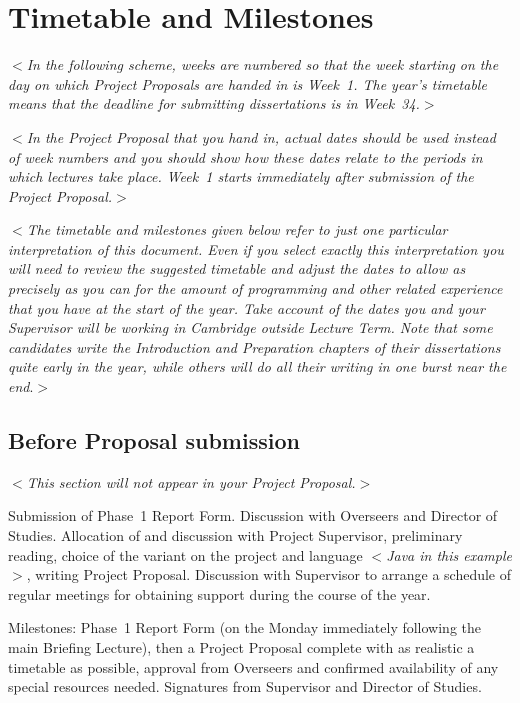 \documentclass[12pt]{article}
\newcommand{\al}{$<$}
\newcommand{\ar}{$>$}
\begin{document}
\section*{Timetable and Milestones}

\al\emph{In the following scheme, weeks are numbered so that the week
  starting on the day on which Project Proposals are handed in is
  Week~1.  The year's timetable means that the deadline for submitting
  dissertations is in Week~34.}\ar

\al\emph{In the Project Proposal that you hand in, {\rm actual dates}
  should be used instead of week numbers and you should show how these
  dates relate to the periods in which lectures take place. Week~1
  starts immediately after submission of the Project Proposal.}\ar

\al\emph{The timetable and milestones given below refer to just one
  particular interpretation of this document.  Even if you select
  exactly this interpretation you will need to review the suggested
  timetable and adjust the dates to allow as precisely as you can for
  the amount of programming and other related experience that you have
  at the start of the year.  Take account of the dates you and your
  Supervisor will be working in Cambridge outside Lecture Term.  Note
  that some candidates write the Introduction and Preparation chapters
  of their dissertations quite early in the year, while others will do
  all their writing in one burst near the end}.\ar


\subsection*{Before Proposal submission}

\al\emph{This section will not appear in your Project Proposal.}\ar
 
Submission of Phase~1 Report Form. Discussion with Overseers and
Director of Studies.  Allocation of and discussion with Project
Supervisor, preliminary reading, choice of the variant on the project
and language \al\emph{Java in this example\/}\ar, writing Project
Proposal.  Discussion with Supervisor to arrange a schedule of regular
meetings for obtaining support during the course of the year.

Milestones: Phase~1 Report Form (on the Monday immediately following
the main Briefing Lecture), then a Project Proposal complete with as
realistic a timetable as possible, approval from Overseers and
confirmed availability of any special resources needed. Signatures
from Supervisor and Director of Studies.
\end{document}
